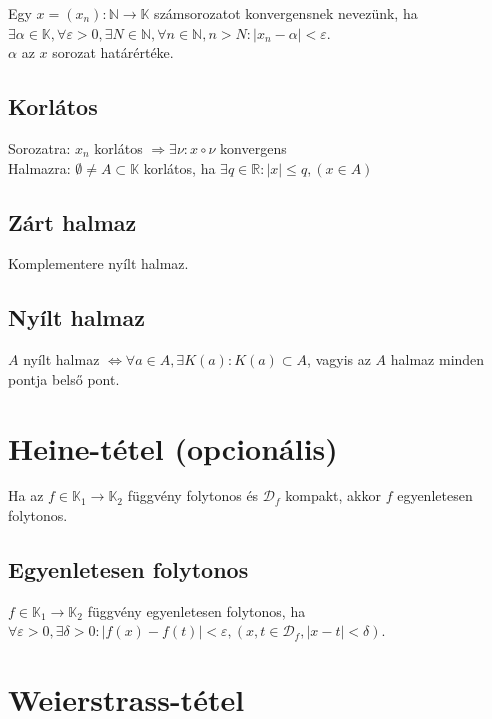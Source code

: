 \documentclass[margin=0px]{article}
\begin{document}
Egy $x = (x_{n}) : \mathbb{N} \to \mathbb{K}$ számsorozatot konvergensnek nevezünk, ha $\exists \alpha \in \mathbb{K}, \forall \varepsilon > 0, \exists N \in \mathbb{N}, \forall n \in \mathbb{N}, n > N : |x_{n}-\alpha| < \varepsilon$. \\
$\alpha$ az $x$ sorozat határértéke.

\subsection{Korlátos}

Sorozatra: $x_{n}$ korlátos $\Rightarrow \exists \nu : x \circ \nu$ konvergens \\
Halmazra: $\emptyset \neq A \subset \mathbb{K}$ korlátos, ha $\exists q \in \mathbb{R} : |x| \leq q, (x \in A)$

\subsection{Zárt halmaz}

Komplementere nyílt halmaz.

\subsection{Nyílt halmaz}

$A$ nyílt halmaz $\iff \forall a \in A, \exists K(a): K(a) \subset A$, vagyis az $A$ halmaz minden pontja belső pont.

\section{Heine-tétel {\large (opcionális)}}

Ha az $f \in \mathbb{K}_{1} \to \mathbb{K}_{2}$ függvény folytonos és $\mathcal{D}_{f}$ kompakt, akkor $f$ egyenletesen folytonos.

\subsection{Egyenletesen folytonos}

$f \in \mathbb{K}_{1} \to \mathbb{K}_{2}$ függvény egyenletesen folytonos, ha $\forall \varepsilon > 0, \exists \delta > 0 : |f(x)-f(t)| < \varepsilon, (x,t \in \mathcal{D}_{f}, |x-t| < \delta)$.

\section{Weierstrass-tétel}
\end{document}
